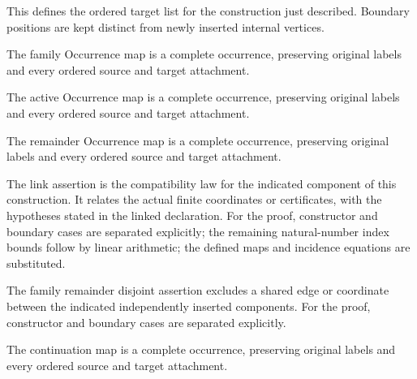 This defines the ordered target list for the construction just described. Boundary positions are kept distinct from newly inserted internal vertices.
\par{}

The family Occurrence map is a complete occurrence, preserving original labels and every ordered source and target attachment.
\par{}

The active Occurrence map is a complete occurrence, preserving original labels and every ordered source and target attachment.
\par{}

The remainder Occurrence map is a complete occurrence, preserving original labels and every ordered source and target attachment.
\par{}

The link assertion is the compatibility law for the indicated component of this construction. It relates the actual finite coordinates or certificates, with the hypotheses stated in the linked declaration.
For the proof, constructor and boundary cases are separated explicitly; the remaining natural-number index bounds follow by linear arithmetic; the defined maps and incidence equations are substituted.
\par{}

The family remainder disjoint assertion excludes a shared edge or coordinate between the indicated independently inserted components.
For the proof, constructor and boundary cases are separated explicitly.
\par{}

The continuation map is a complete occurrence, preserving original labels and every ordered source and target attachment.
\par{}


